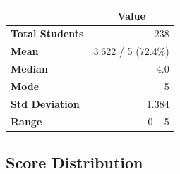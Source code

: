 \documentclass[12pt, a4paper]{article}
\begin{document}
	\begin{center}
		\begin{tcolorbox}[
			width=0.7\textwidth,
			colback=rowA,
			colframe=primary,
			arc=4pt,
			boxrule=0.8pt
			]
			\centering
			\renewcommand{\arraystretch}{1.4}
			\begin{tabular}{>{\bfseries}l r}
				\toprule
				\multicolumn{1}{c}{\color{primary}\textbf{Statistic}} &
				\multicolumn{1}{c}{\color{primary}\textbf{Value}} \\
				\midrule
				Total Students  & 238 \\
				Mean            & 3.622 / 5 \quad (72.4\%) \\
				Median          & 4.0 \\
				Mode            & 5 \\
				Std Deviation   & 1.384 \\
				Range           & 0 -- 5 \\
				\bottomrule
			\end{tabular}
		\end{tcolorbox}
	\end{center}
	
	\subsection{Score Distribution}
	
\end{document}

